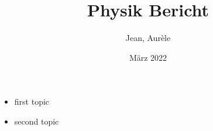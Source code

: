 \documentclass{report}
\title{Physik Bericht}
\author{Jean, Aurèle}
\date{März 2022}
\begin{document}
\maketitle
\begin{itemize}
    \item first topic
    \item second topic
\end{itemize}
\end{document}

